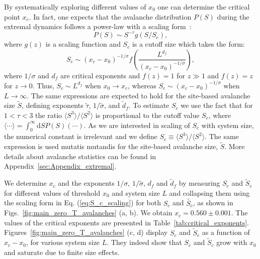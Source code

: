 \documentclass[pre,twocolumn,superscriptaddress,tightenlines,showpacs,longbibliography,floatfix,footinbib]{revtex4-1}
\begin{document}
By systematically exploring different values of $x_0$ one can determine the critical point $x_c$.
In fact, one expects that the avalanche distribution $P(S)$ during the extremal dynamics follows a power-law with a scaling form~\cite{paczuski1996avalanche,purrello2017creep,han2018critical}:
\begin{equation}
    P(S) \sim S^{-\tau} g(S/S_c),
    \label{eq:P_of_S_power_law}
\end{equation}
where $g(z)$ is a scaling function and $S_c$ is a cutoff size which takes the form: 
\begin{equation}
    S_c \sim (x_c-x_0)^{-1/\sigma}f\left( \frac{L^{d_f}}{(x_c-x_0)^{-1/\sigma}}\right),
    \label{eq:S_c_scaling}
\end{equation}
where $1/\sigma$ and $d_f$ are critical exponents and $f(z) = 1$ for $z \gg 1$ and $f(z)=z$ for $z \to 0$.
Thus, $S_c \sim L^{d_f}$ when $x_0 \to x_c$, whereas $S_c \sim (x_c-x_0)^{-1/\sigma}$ when $L \to \infty$.
The same expressions are expected to hold for the site-based avalanche size $\tilde S$, defining exponents $\tilde\tau$, $1/\tilde \sigma $, and $\tilde d_f$.
To estimate $S_c$ we use the fact that for $1 <\tau < 3$ the ratio $\langle S^3 \rangle / \langle S^2 \rangle$ is proportional to the cutoff value $S_c$, where $\langle \cdots \rangle=\int_0^{\infty} \mathrm{d} S  P(S)(\cdots)$. As we are interested in scaling of $S_c$ with system size, the numerical constant is irrelevant and we  define $S_c \equiv \langle S^3 \rangle/\langle S^2 \rangle$.
The same expression is used mutatis mutandis for the site-based avalanche size, $\tilde S$.
More details about avalanche statistics can be found in Appendix~\ref{sec:Appendix_extremal}.

We determine $x_c$ and the exponents $1/\sigma$, $1/\tilde{\sigma}$, $d_f$ and $\tilde{d}_f$ by measuring $S_c$ and $\tilde{S}_c$ for different values of threshold $x_0$ and system size $L$ and collapsing them using the 
scaling form in Eq. (\ref{eq:S_c_scaling}) %
for both $S_c$ and $\tilde{S_c}$, as shown in Figs.~\ref{fig:main_zero_T_avalanches} (a, b). We obtain 
$x_c= 0.560\pm 0.001$. The values of the critical exponents are presented in Table~\ref{tab:critical_exponents}.
Figures~\ref{fig:main_zero_T_avalanches} (c, d) display $S_c$ and $\tilde S_c$ as a function of $x_c-x_0$, for various system size $L$. They indeed show that $S_c$ and $\tilde S_c$ grow with $x_0$ and saturate due to finite size effects. 
\end{document}
